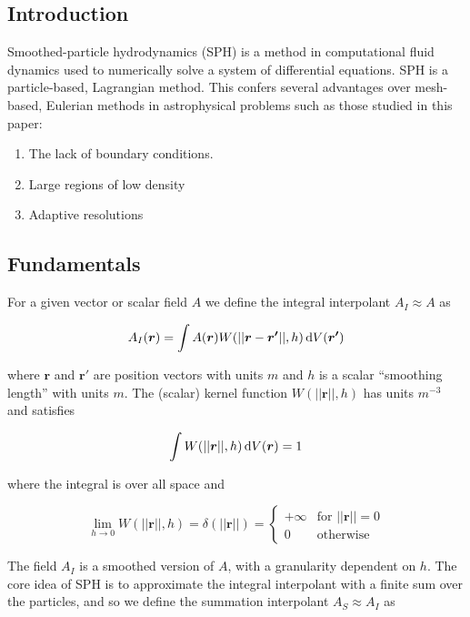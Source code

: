 \documentclass[../main.tex]{subfiles}
\begin{document}
\subsection{Introduction}
Smoothed-particle hydrodynamics (SPH) is a method in computational fluid dynamics used to
numerically solve a system of differential equations. SPH is a particle-based, Lagrangian method.
This confers several advantages over mesh-based, Eulerian methods in astrophysical problems such as
those studied in this paper:
\begin{enumerate}
    \item The lack of boundary conditions.
    \item Large regions of low density
    \item Adaptive resolutions
\end{enumerate}

\subsection{Fundamentals}
For a given vector or scalar field $A$ we define the integral interpolant $A_I \approx A$ as

\begin{equation}
    A_I(\bm{r})
    = \int A(\bm{r}) W(||\bm{r} - \bm{r'}||, h) \,\mathrm{d} V(\bm{r'})
\end{equation}

where $\bm{r}$ and $\bm{r'}$ are position vectors with units $m$ and $h$ is a scalar ``smoothing
length'' with units $m$. The (scalar) kernel function $W(||\bm{r}||, h)$ has units $m^{-3}$ and
satisfies

\begin{equation}
    \int W(||\bm{r}||, h) \,\mathrm{d} V(\bm{r}) = 1
\end{equation}

where the integral is over all space and

\begin{equation}
    \lim_{h\to0} W(||\bm{r}||, h)
    = \delta(||\bm{r}||)
    = \begin{cases}
        +\infty & \text{for } ||\bm{r}|| = 0 \\
        0 & \text{otherwise} \end{cases}
\end{equation}

The field $A_I$ is a smoothed version of $A$, with a granularity dependent on $h$. The core idea of
SPH is to approximate the integral interpolant with a finite sum over the particles, and so we
define the summation interpolant $A_S \approx A_I$ as
\end{document}
